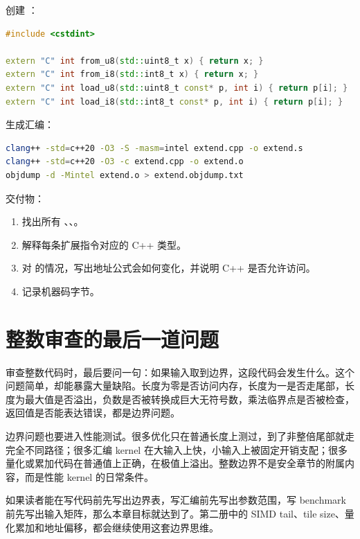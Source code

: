 \begin{labbox}
创建 ：

\begin{lstlisting}[language=C++]
#include <cstdint>

extern "C" int from_u8(std::uint8_t x) { return x; }
extern "C" int from_i8(std::int8_t x) { return x; }
extern "C" int load_u8(std::uint8_t const* p, int i) { return p[i]; }
extern "C" int load_i8(std::int8_t const* p, int i) { return p[i]; }
\end{lstlisting}

生成汇编：

\begin{lstlisting}[language=bash]
clang++ -std=c++20 -O3 -S -masm=intel extend.cpp -o extend.s
clang++ -std=c++20 -O3 -c extend.cpp -o extend.o
objdump -d -Mintel extend.o > extend.objdump.txt
\end{lstlisting}

交付物：

\begin{enumerate}
  \item 找出所有 、、。
  \item 解释每条扩展指令对应的 C++ 类型。
  \item 对  的情况，写出地址公式会如何变化，并说明 C++ 是否允许访问。
  \item 记录机器码字节。
\end{enumerate}
\end{labbox}

\section{整数审查的最后一道问题}

审查整数代码时，最后要问一句：如果输入取到边界，这段代码会发生什么。这个问题简单，却能暴露大量缺陷。长度为零是否访问内存，长度为一是否走尾部，长度为最大值是否溢出，负数是否被转换成巨大无符号数，乘法临界点是否被检查，返回值是否能表达错误，都是边界问题。

边界问题也要进入性能测试。很多优化只在普通长度上测过，到了非整倍尾部就走完全不同路径；很多汇编 kernel 在大输入上快，小输入上被固定开销支配；很多量化或累加代码在普通值上正确，在极值上溢出。整数边界不是安全章节的附属内容，而是性能 kernel 的日常条件。

如果读者能在写代码前先写出边界表，写汇编前先写出参数范围，写 benchmark 前先写出输入矩阵，那么本章目标就达到了。第二册中的 SIMD tail、tile size、量化累加和地址偏移，都会继续使用这套边界思维。

